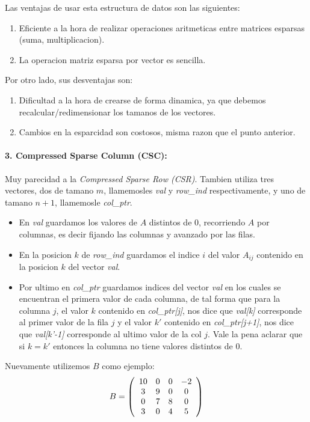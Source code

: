 Las ventajas de usar esta estructura de datos son las siguientes:
\begin{enumerate}
  \item Eficiente a la hora de realizar operaciones aritmeticas entre matrices esparsas (suma, multiplicacion).
  \item La operacion matriz esparsa por vector es sencilla.
\end{enumerate}
Por otro lado, sus desventajas son:
\begin{enumerate}
  \item Dificultad a la hora de crearse de forma dinamica, ya que debemos recalcular/redimensionar los tamanos de los vectores.
  \item Cambios en la esparcidad son costosos, misma razon que el punto anterior.
\end{enumerate}

\paragraph{3. Compressed Sparse Column (CSC):}

Muy parecidad a la \textit{Compressed Sparse Row (CSR)}.
 Tambien utiliza tres vectores, dos de tamano $m$, llamemosles \textit{val} y \textit{row_ind} respectivamente, y uno de tamano $n+1$, llamemosle \textit{col_ptr}.

 \begin{itemize}
     \item En \textit{val} guardamos los valores de $A$ distintos de 0, recorriendo $A$ por columnas, es decir fijando las columnas y avanzado por las filas.
     \item En la posicion $k$ de \textit{row_ind} guardamos el indice $i$ del valor $A_{ij}$ contenido en la posicion $k$ del vector \textit{val}.
     \item Por ultimo en \textit{col_ptr} guardamos indices del vector \textit{val} en los cuales se encuentran el primera valor de cada columna, de tal forma que para la columna $j$, el valor $k$ contenido en \textit{col_ptr[j]}, nos dice que \textit{val[k]} corresponde al primer valor de la fila $j$ y el valor $k'$ contenido en \textit{col_ptr[j+1]}, nos dice que \textit{val[k'-1]} corresponde al ultimo valor de la col $j$. Vale la pena aclarar que si $k = k'$ entonces la columna no tiene valores distintos de 0.
 \end{itemize}

Nuevamente utilizemos $B$ como ejemplo:
\[
  B = \left(\begin{array}{*5{c}}
    10 & 0 & 0 & -2\\
    3  & 9 & 0 & 0 \\
    0  & 7 & 8 & 0 \\
    3  & 0 & 4 & 5
  \end{array}\right)
\]

